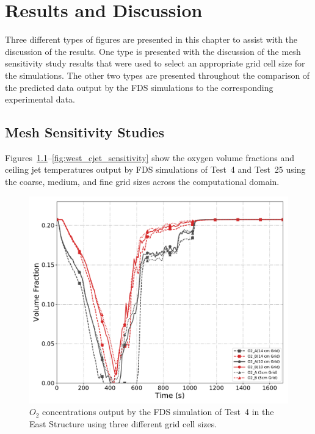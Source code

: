 \renewcommand{\thechapter}{5}

\chapter{Results and Discussion}
\label{chap:results_disc}
Three different types of figures are presented in this chapter to assist with the discussion of the results. One type is presented with the discussion of the mesh sensitivity study results that were used to select an appropriate grid cell size for the simulations. The other two types are presented throughout the comparison of the predicted data output by the FDS simulations to the corresponding experimental data. 

\section{Mesh Sensitivity Studies}
\label{sec:mesh_studies}
Figures~\ref{fig:east_O2_sensitivity}--\ref{fig:west_cjet_sensitivity} show the oxygen volume fractions and ceiling jet temperatures output by FDS simulations of Test~4 and Test~25 using the coarse, medium, and fine grid sizes across the computational domain.
\begin{figure}[!h]
	\centering
	\includegraphics[width=\columnwidth]{Figures/Plots/Grid_Sensitivity/Gas_Concentration/Test_04_O2}
	\caption[$O_2$ concentrations for East Structure simulation with different grid cell sizes.]{$O_2$ concentrations output by the FDS simulation of Test~4 in the East Structure using three different grid cell sizes.}
	\label{fig:east_O2_sensitivity}
\end{figure}

